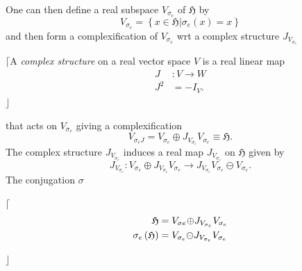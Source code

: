 \documentclass[aps,preprint]{revtex4}
\begin{document}
One can then define a real subspace $V_{\sigma_{e}}$ of $\mathfrak{H}$ by 
\begin{equation}
V_{\sigma_{e}}=\left\{ \left. x\in\mathfrak{H}\right\vert \mathcal{\sigma }%
_{e}\left( x\right) =x\right\}
\end{equation}
and then form a complexification of $V_{\sigma_{e}}$ wrt a complex structure 
$J_{V_{\sigma_{e}}}$

$\lceil$A \emph{complex structure} on a real vector space $V$ is a real
linear map 
\begin{align}
J & :V\rightarrow W \\
J^{2} & =-I_{V}.
\end{align}
$\rfloor$

that acts on $V_{\sigma_{e}}$ giving a complexification 
\begin{equation}
V_{\sigma_{e}J}=V_{\sigma_{e}}\oplus J_{V_{\sigma_{e}}}V_{\sigma_{e}}\equiv%
\mathfrak{H.}
\end{equation}
The complex structure $J_{V_{\sigma_{e}}}$ induces a real map $J_{V_{\sigma
_{e}}}$ on $\mathfrak{H}$ given by 
\begin{equation}
J_{V_{\sigma_{e}}}:V_{\sigma_{e}}\oplus
J_{V_{\sigma_{e}}}V_{\sigma_{e}}\rightarrow
J_{V_{\sigma_{e}}}V_{\sigma_{e}}\ominus V_{\sigma_{e}}.
\end{equation}
The conjugation $\sigma$

$\lceil$%
\begin{align}
\mathfrak{H} & =V_{\sigma e_{{}}}\mathcal{\oplus}J_{V_{\sigma_{e}}}V_{%
\sigma_{e}} \\
\mathcal{\sigma}_{e}\left( \mathfrak{H}\right) & =V_{\sigma_{e}}\mathcal{%
\ominus}J_{V_{\sigma_{e}}}V_{\sigma_{e}}
\end{align}

$\rfloor$
\end{document}
